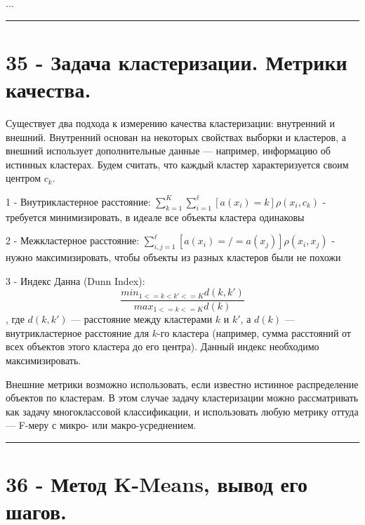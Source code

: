 \documentclass[11pt]{article}
\begin{document}
...

    \begin{center}\rule{0.5\linewidth}{\linethickness}\end{center}

    \section{35 - Задача кластеризации. Метрики
качества.}\label{ux437ux430ux434ux430ux447ux430-ux43aux43bux430ux441ux442ux435ux440ux438ux437ux430ux446ux438ux438.-ux43cux435ux442ux440ux438ux43aux438-ux43aux430ux447ux435ux441ux442ux432ux430.}

Существует два подхода к измерению качества кластеризации: внутренний и
внешний. Внутренний основан на некоторых свойствах выборки и кластеров,
а внешний использует дополнительные данные --- например, информацию об
истинных кластерах. Будем считать, что каждый кластер характеризуется
своим центром \(c_k\).

1 - Внутрикластерное расстояние:
\(\sum_{k=1}^K\sum_{i=1}^ℓ[a(x_i) = k]ρ(x_i, c_k)\) - требуется
минимизировать, в идеале все объекты кластера одинаковы

2 - Межкластерное расстояние:
\(\sum_{i,j=1}^ℓ[a(x_i) =/= a(x_j)]ρ(x_i, x_j)\) - нужно
максимизировать, чтобы объекты из разных кластеров были не похожи

3 - Индекс Данна (Dunn Index):
\[\frac{min_{1<=k<k′<=K} d(k, k′)}{max_{1<=k<=K} d(k)}\], где
\(d(k, k′)\) --- расстояние между кластерами \(k\) и \(k′\), а \(d(k)\)
--- внутрикластерное расстояние для \(k\)-го кластера (например, сумма
расстояний от всех объектов этого кластера до его центра). Данный индекс
необходимо максимизировать.

Внешние метрики возможно использовать, если известно истинное
распределение объектов по кластерам. В этом случае задачу кластеризации
можно рассматривать как задачу многоклассовой классификации, и
использовать любую метрику оттуда --- F-меру с микро- или
макро-усреднением.

    \begin{center}\rule{0.5\linewidth}{\linethickness}\end{center}

    \section{36 - Метод K-Means, вывод его
шагов.}\label{ux43cux435ux442ux43eux434-k-means-ux432ux44bux432ux43eux434-ux435ux433ux43e-ux448ux430ux433ux43eux432.}
\end{document}
